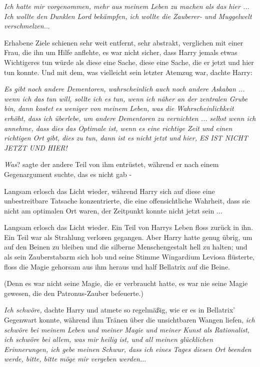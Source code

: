 \emph{Ich hatte mir vorgenommen, mehr aus meinem Leben zu machen als das
hier ... Ich wollte den Dunklen Lord bekämpfen, ich wollte die Zauberer- und
Muggelwelt verschmelzen.}..

Erhabene Ziele schienen sehr weit entfernt, sehr abstrakt, verglichen mit einer
Frau, die ihn um Hilfe anflehte, es war nicht sicher, dass Harry jemals etwas
Wichtigeres tun würde als diese eine Sache, diese eine Sache, die er jetzt und
hier tun konnte. Und mit dem, was vielleicht sein letzter Atemzug war, dachte
Harry:

\emph{Es gibt noch andere Dementoren, wahrscheinlich auch noch andere Askaban ...
wenn ich das tun will, sollte ich es tun, wenn ich näher an der zentralen Grube
bin, dann kostet es weniger von meinem Leben, was die Wahrscheinlichkeit erhöht,
dass ich überlebe, um andere Dementoren zu vernichten ... selbst wenn ich
annehme, dass dies das Optimale ist, wenn es eine richtige Zeit und einen
richtigen Ort gibt, dies zu tun, dann ist es nicht jetzt und hier, ES IST NICHT
JETZT UND HIER!}

\emph{Was}? sagte der andere Teil von ihm entrüstet, während er nach einem
Gegenargument suchte, das es nicht gab -

Langsam erlosch das Licht wieder, während Harry sich auf diese eine
unbestreitbare Tatsache konzentrierte, die eine offensichtliche Wahrheit, dass
sie nicht am optimalen Ort waren, der Zeitpunkt konnte nicht jetzt sein ...

Langsam erlosch das Licht wieder. Ein Teil von Harrys Leben floss zurück in ihn.
Ein Teil war als Strahlung verloren gegangen. Aber Harry hatte genug übrig, um
auf den Beinen zu bleiben und die silberne Menschengestalt hell zu halten; und
als sein Zauberstabarm sich hob und seine Stimme \glqq{}Wingardium Leviosa\grqq{}
flüsterte, floss die Magie gehorsam aus ihm heraus und half Bellatrix auf die
Beine.

(Denn es war nicht seine Magie, die er verbraucht hatte, es war nie seine Magie
gewesen, die den Patronus-Zauber befeuerte.)

\emph{Ich schwöre,} dachte Harry und atmete so regelmäßig, wie er es in
Bellatrix' Gegenwart konnte, während ihm Tränen über die unsichtbaren Wangen
liefen,\emph{ ich schwöre bei meinem Leben und meiner Magie und meiner Kunst als
Rationalist, ich schwöre bei allem, was mir heilig ist, und all meinen
glücklichen Erinnerungen, ich gebe meinen Schwur, dass ich eines Tages diesen
Ort beenden werde, bitte, bitte möge mir vergeben werden.}..

